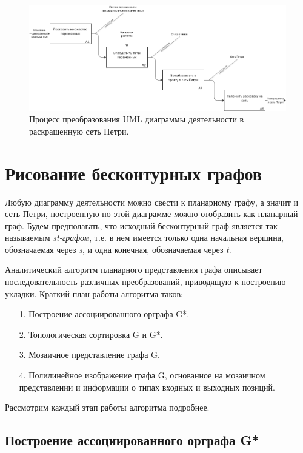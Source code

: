 \begin{figure}
	\begin{center}
		\includegraphics[width=\textwidth]{include/IDEF0ColoredPetri.png}
	\end{center}
	\caption{Процесс преобразования UML диаграммы деятельности в раскрашенную сеть Петри.}
	\label{fig:fig8}
\end{figure}

\section{Рисование бесконтурных графов}

Любую диаграмму деятельности можно свести к планарному графу, а значит и сеть Петри, построенную по этой диаграмме можно отобразить как планарный граф. Будем предполагать, что исходный бесконтурный граф является так называемым \textit{st-графом}, т.е. в нем имеется только одна начальная вершина, обозначаемая через \textit{s}, и одна конечная, обозначаемая через \textit{t}.

Аналитический алгоритм планарного представления графа описывает последовательность различных преобразований, приводящую к построению укладки. \cite{Battista} Краткий план работы алгоритма таков:
\begin{enumerate}
\item[1.] Построение ассоциированного орграфа G*.
\item[2.] Топологическая сортировка G и G*.
\item[3.] Мозаичное представление графа G.
\item[4.] Полилинейное изображение графа G, основанное на мозаичном представлении и информации о типах входных и выходных позиций.
\end{enumerate}

Рассмотрим каждый этап работы алгоритма подробнее.

\subsection{Построение ассоциированного орграфа G*}

